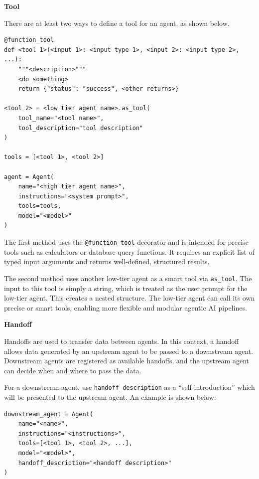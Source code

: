 \vspace{0.1in}
\noindent \textbf{Tool}
\vspace{0.1in}

There are at least two ways to define a tool for an agent, as shown below.

\begin{lstlisting}
@function_tool
def <tool 1>(<input 1>: <input type 1>, <input 2>: <input type 2>, ...):
    """<description>"""
    <do something>
    return {"status": "success", <other returns>}

<tool 2> = <low tier agent name>.as_tool(
    tool_name="<tool name>",
    tool_description="tool description"
)

tools = [<tool 1>, <tool 2>]

agent = Agent(
    name="<high tier agent name>",
    instructions="<system prompt>",
    tools=tools,
    model="<model>"
)
\end{lstlisting}

The first method uses the \verb|@function_tool| decorator and is intended for precise tools such as calculators or database query functions. It requires an explicit list of typed input arguments and returns well-defined, structured results.

The second method uses another low-tier agent as a smart tool via \verb|as_tool|. The input to this tool is simply a string, which is treated as the user prompt for the low-tier agent. This creates a nested structure. The low-tier agent can call its own precise or smart tools, enabling more flexible and modular agentic AI pipelines.

\vspace{0.1in}
\noindent \textbf{Handoff}
\vspace{0.1in}

Handoffs are used to transfer data between agents. In this context, a handoff allows data generated by an upstream agent to be passed to a downstream agent. Downstream agents are registered as available handoffs, and the upstream agent can decide when and where to pass the data.

For a downstream agent, use \verb|handoff_description| as a ``self introduction'' which will be presented to the upstream agent. An example is shown below:
\begin{lstlisting}
downstream_agent = Agent(
    name="<name>",
    instructions="<instructions>",
    tools=[<tool 1>, <tool 2>, ...],
    model="<model>",
    handoff_description="<handoff description>"
)
\end{lstlisting}

